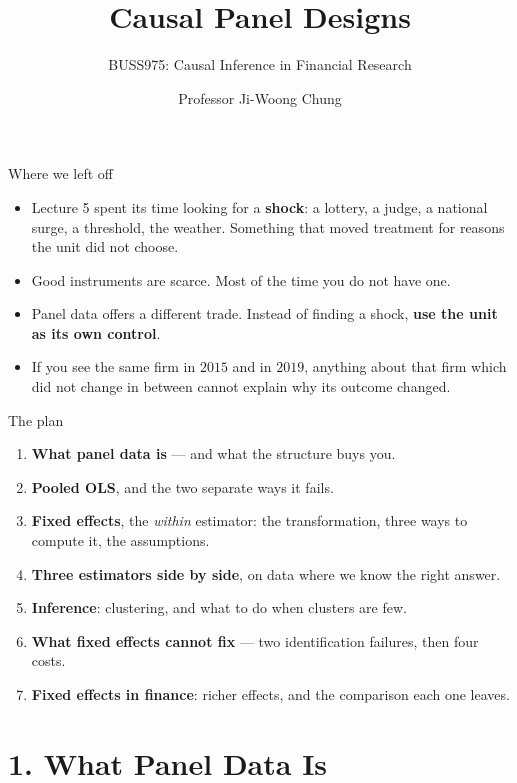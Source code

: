 \documentclass[
  11pt,
  ignorenonframetext,
  aspectratio=169,
]{beamer}
\title{\texorpdfstring{Causal Panel Designs}{Causal Panel Designs}}
\subtitle{\texorpdfstring{BUSS975: Causal Inference in Financial
Research}{BUSS975: Causal Inference in Financial Research}}
\author{Professor Ji-Woong Chung}
\date{}
\institute{Korea University}
\providecommand{\tightlist}{%
  \setlength{\itemsep}{0pt}\setlength{\parskip}{0pt}}
\begin{document}
\frame{\titlepage}


\begin{frame}{Where we left off}
\protect{}\label{where-we-left-off}
\begin{itemize}
\tightlist
\item
  Lecture 5 spent its time looking for a \textbf{shock}: a lottery, a
  judge, a national surge, a threshold, the weather. Something that
  moved treatment for reasons the unit did not choose.
\item
  Good instruments are scarce. Most of the time you do not have one.
\end{itemize}

\vspace{0.4em}

\begin{itemize}
\tightlist
\item
  Panel data offers a different trade. Instead of finding a shock,
  \textbf{use the unit as its own control}.
\item
  If you see the same firm in \(2015\) and in \(2019\), anything about
  that firm which did not change in between cannot explain why its
  outcome changed.
\end{itemize}
\end{frame}

\begin{frame}{The plan}
\protect{}\label{the-plan}
\begin{enumerate}
\tightlist
\item
  \textbf{What panel data is} --- and what the structure buys you.
\item
  \textbf{Pooled OLS}, and the two separate ways it fails.
\item
  \textbf{Fixed effects}, the \emph{within} estimator: the
  transformation, three ways to compute it, the assumptions.
\item
  \textbf{Three estimators side by side}, on data where we know the
  right answer.
\item
  \textbf{Inference}: clustering, and what to do when clusters are few.
\item
  \textbf{What fixed effects cannot fix} --- two identification
  failures, then four costs.
\item
  \textbf{Fixed effects in finance}: richer effects, and the comparison
  each one leaves.
\end{enumerate}
\end{frame}

\section{1. What Panel Data Is}\label{what-panel-data-is}
\end{document}
